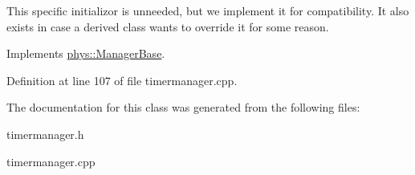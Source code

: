 This specific initializor is unneeded, but we implement it for compatibility. It also exists in case a derived class wants to override it for some reason. 

Implements \hyperlink{classphys_1_1ManagerBase_a57dd8e54e767427d5bdcc86dc66d73ed}{phys::ManagerBase}.



Definition at line 107 of file timermanager.cpp.



The documentation for this class was generated from the following files:\begin{DoxyCompactItemize}
\item 
timermanager.h\item 
timermanager.cpp\end{DoxyCompactItemize}
